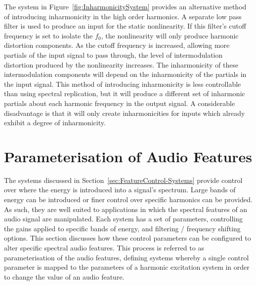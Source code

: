 		The system in Figure~\ref{fig:InharmonicitySystem} provides an alternative method of introducing
		inharmonicity in the high order harmonics. A separate low pass filter is used to produce an input for the
		static nonlinearity. If this filter's cutoff frequency is set to isolate the $f_{0}$, the nonlinearity will
		only produce harmonic distortion components. As the cutoff frequency is increased, allowing more partials
		of the input signal to pass through, the level of intermodulation distortion produced by the nonlinearity
		increases. The inharmonicity of these intermodulation components will depend on the inharmonicity of the
		partials in the input signal. This method of introducing inharmonicity is less controllable than using
		spectral replication, but it will produce a different set of inharmonic partials about each harmonic
		frequency in the output signal. A considerable disadvantage is that it will only create inharmonicities for
		inputs which already exhibit a degree of inharmonicity.

\section{Parameterisation of Audio Features}
\label{sec:FeatureControl-Parameterisation}
	The systems discussed in Section~\ref{sec:FeatureControl-Systems} provide control over where the energy is
	introduced into a signal's spectrum. Large bands of energy can be introduced or finer control over specific
	harmonics can be provided. As such, they are well suited to applications in which the spectral features of an audio
	signal are manipulated. Each system has a set of parameters, controlling the gains applied to specific bands of
	energy, and filtering / frequency shifting options. This section discusses how these control parameters can be
	configured to alter specific spectral audio features. This process is referred to as parameterisation of the audio
	features, defining systems whereby a single control parameter is mapped to the parameters of a harmonic excitation
	system in order to change the value of an audio feature.

